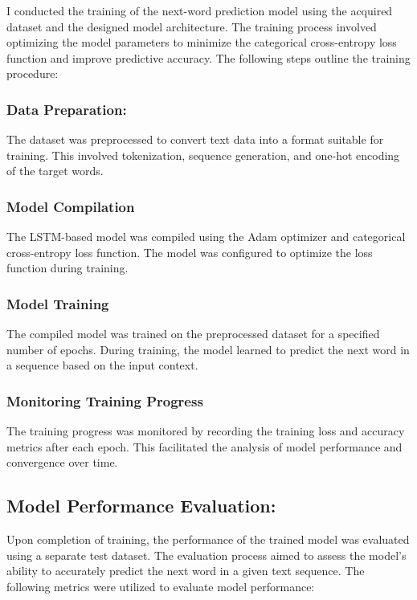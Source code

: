 \documentclass[conference]{IEEEtran}
\begin{document}
I conducted the training of the next-word prediction model using the acquired dataset and the designed model architecture. The training process involved optimizing the model parameters to minimize the categorical cross-entropy loss function and improve predictive accuracy. The following steps outline the training procedure:

\subsubsection{Data Preparation: }
    The dataset was preprocessed to convert text data into a format suitable for training. This involved tokenization, sequence generation, and one-hot encoding of the target words.
    
\subsubsection{ Model Compilation}
     The LSTM-based model was compiled using the Adam optimizer and categorical cross-entropy loss function. The model was configured to optimize the loss function during training.
    
   
\subsubsection{ Model Training}
    The compiled model was trained on the preprocessed dataset for a specified number of epochs. During training, the model learned to predict the next word in a sequence based on the input context.

\subsubsection{Monitoring Training Progress}
    The training progress was monitored by recording the training loss and accuracy metrics after each epoch. This facilitated the analysis of model performance and convergence over time.


\subsection{Model Performance Evaluation:}

Upon completion of training, the performance of the trained model was evaluated using a separate test dataset. The evaluation process aimed to assess the model's ability to accurately predict the next word in a given text sequence. The following metrics were utilized to evaluate model performance:
\end{document}
